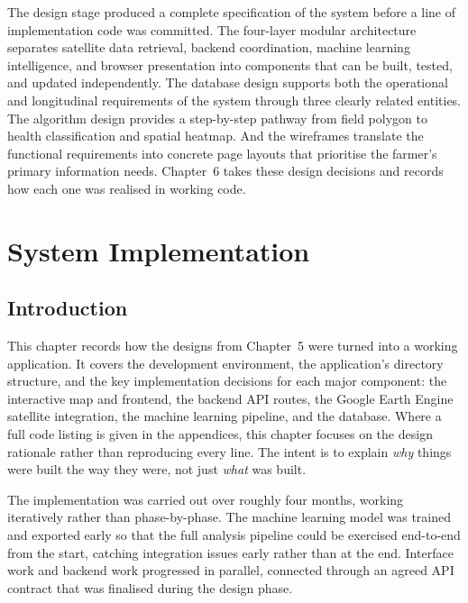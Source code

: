 The design stage produced a complete specification of the system before a line of implementation code was committed. The four-layer modular architecture separates satellite data retrieval, backend coordination, machine learning intelligence, and browser presentation into components that can be built, tested, and updated independently. The database design supports both the operational and longitudinal requirements of the system through three clearly related entities. The algorithm design provides a step-by-step pathway from field polygon to health classification and spatial heatmap. And the wireframes translate the functional requirements into concrete page layouts that prioritise the farmer's primary information needs. Chapter~6 takes these design decisions and records how each one was realised in working code.

\chapter{System Implementation}

\section{Introduction}

This chapter records how the designs from Chapter~5 were turned into a working application. It covers the development environment, the application's directory structure, and the key implementation decisions for each major component: the interactive map and frontend, the backend API routes, the Google Earth Engine satellite integration, the machine learning pipeline, and the database. Where a full code listing is given in the appendices, this chapter focuses on the design rationale rather than reproducing every line. The intent is to explain \emph{why} things were built the way they were, not just \emph{what} was built.

The implementation was carried out over roughly four months, working iteratively rather than phase-by-phase. The machine learning model was trained and exported early so that the full analysis pipeline could be exercised end-to-end from the start, catching integration issues early rather than at the end. Interface work and backend work progressed in parallel, connected through an agreed API contract that was finalised during the design phase.


